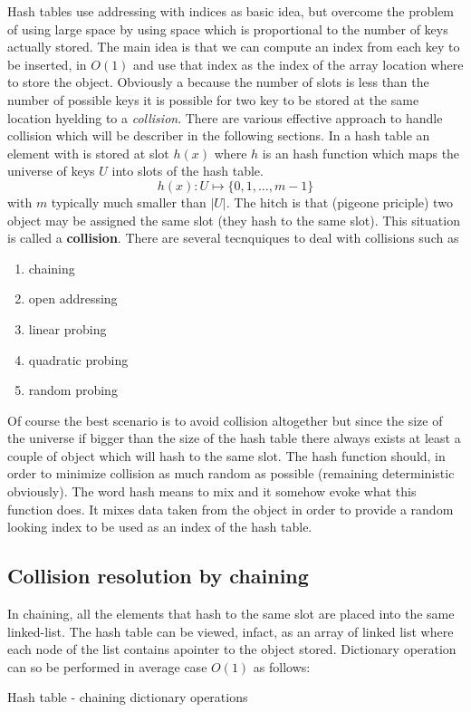 Hash tables use addressing with indices as basic idea, but overcome the problem of using large space by using space which is proportional to the number of keys actually stored. The main idea is that we can compute an index from each key to be inserted, in $O(1)$ and use that index as the index of the array location where to store the object. Obviously a because the number of slots is less than the number of possible keys it is possible for two key to be stored at the same location hyelding to a \textit{collision}. There are various effective approach to handle collision which will be describer in the following sections.
In a hash table an element with is stored at slot $h(x)$ where $h$ is an hash function which maps the universe of keys $U$ into slots of the hash table.
\[
h(x): U \mapsto \{0,1,\ldots,m-1\}
\]
with $m$ typically much smaller than $|U|$. The hitch is that (pigeone priciple) two object may be assigned the same slot (they hash to the same slot). This situation is called a \textbf{collision}. There are several tecnquiques to deal with collisions such as 
\begin{enumerate}
\item chaining
\item open addressing
\item linear probing
\item quadratic probing
\item random probing
\end{enumerate}
Of course the best scenario is to avoid collision altogether but since the size of the universe if bigger than the size of the hash table there always exists at least a couple of object which will hash to the same slot. The hash function should, in order to minimize collision as much random as possible (remaining deterministic obviously). The word hash means to mix and it somehow evoke what this function does. It mixes data taken from the object in order to provide a random looking index to be used as an index of the hash table.

\subsection{Collision resolution by chaining}
In chaining, all the elements that hash to the same slot are placed into the same linked-list. The hash table can be viewed, infact, as an array of linked list where each node of the list contains apointer to the object stored.
Dictionary operation can so be performed in average case $O(1)$ as follows:
\begin{algorithm}
\caption{Hash table - chaining dictionary operations }
\end{algorithm}

